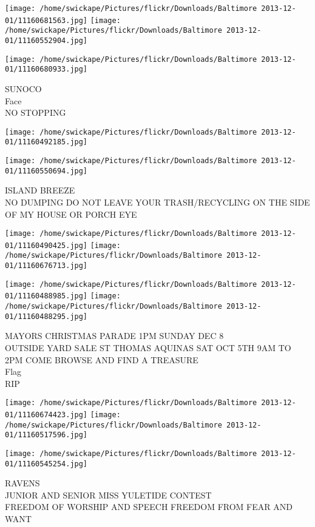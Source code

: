 \documentclass[10pt,letterpaper]{article}
\begin{document}
\texttt{[image: /home/swickape/Pictures/flickr/Downloads/Baltimore 2013-12-01/11160681563.jpg]}
\texttt{[image: /home/swickape/Pictures/flickr/Downloads/Baltimore 2013-12-01/11160552904.jpg]}

\texttt{[image: /home/swickape/Pictures/flickr/Downloads/Baltimore 2013-12-01/11160680933.jpg]}

SUNOCO\\
Face\\
NO STOPPING
\pagebreak

\texttt{[image: /home/swickape/Pictures/flickr/Downloads/Baltimore 2013-12-01/11160492185.jpg]}

\vspace{0.25in}
\texttt{[image: /home/swickape/Pictures/flickr/Downloads/Baltimore 2013-12-01/11160550694.jpg]}

ISLAND BREEZE\\
NO DUMPING DO NOT LEAVE YOUR TRASH/RECYCLING ON THE SIDE OF MY HOUSE OR PORCH EYE
\pagebreak

\texttt{[image: /home/swickape/Pictures/flickr/Downloads/Baltimore 2013-12-01/11160490425.jpg]}
\texttt{[image: /home/swickape/Pictures/flickr/Downloads/Baltimore 2013-12-01/11160676713.jpg]}

\texttt{[image: /home/swickape/Pictures/flickr/Downloads/Baltimore 2013-12-01/11160488985.jpg]}
\texttt{[image: /home/swickape/Pictures/flickr/Downloads/Baltimore 2013-12-01/11160488295.jpg]}

MAYORS CHRISTMAS PARADE 1PM SUNDAY DEC 8\\
OUTSIDE YARD SALE ST THOMAS AQUINAS SAT OCT 5TH 9AM TO 2PM COME BROWSE AND FIND A TREASURE\\
Flag\\
RIP
\pagebreak

\texttt{[image: /home/swickape/Pictures/flickr/Downloads/Baltimore 2013-12-01/11160674423.jpg]}
\texttt{[image: /home/swickape/Pictures/flickr/Downloads/Baltimore 2013-12-01/11160517596.jpg]}

\vspace{0.25in}
\texttt{[image: /home/swickape/Pictures/flickr/Downloads/Baltimore 2013-12-01/11160545254.jpg]}

RAVENS\\
JUNIOR AND SENIOR MISS YULETIDE CONTEST\\
FREEDOM OF WORSHIP AND SPEECH FREEDOM FROM FEAR AND WANT
\pagebreak
\end{document}
